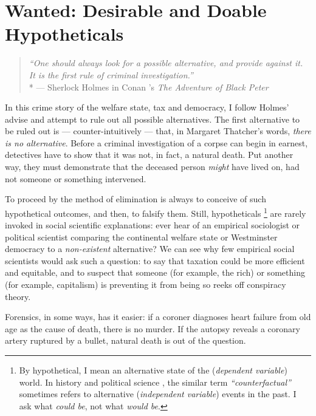 
\chapter[Wanted]{Wanted: Desirable and Doable Hypotheticals} \label{chap:wanted}

\begin{quote}
	\emph{``One should always look for a possible alternative, and provide against it. It is the first rule of criminal investigation.''}\\*
	--- Sherlock Holmes in Conan \citeauthor{Doyle1904}'s \emph{The Adventure of Black Peter} \citeyearpar[567]{Doyle1904}
\end{quote}

In this crime story of the welfare state, tax and democracy, I follow Holmes' advise and attempt to rule out all possible alternatives.
The first alternative to be ruled out is --- counter-intuitively --- that, in Margaret Thatcher's words, \emph{there is no alternative}.
Before a criminal investigation of a corpse can begin in earnest, detectives have to show that it was not, in fact, a natural death.
Put another way, they must demonstrate that the deceased person \emph{might} have lived on, had not someone or something intervened.

To proceed by the method of elimination is always to conceive of such hypothetical outcomes, and then, to falsify them. Still, hypotheticals
\footnote{
	By hypothetical, I mean an alternative state of the (\emph{dependent variable}) world.
	In history \citep[recently reviewed by][]{Bunzl2004} and political science \citep[for a methodological appraisal, see][]{Fearon1991}, the similar term \emph{``counterfactual''} sometimes refers to alternative (\emph{independent variable}) events in the past. I ask what \emph{could be}, not what \emph{would be}.
}
are rarely invoked in social scientific explanations: ever hear of an empirical sociologist or political scientist comparing the continental welfare state \citep{Esping-Andersen-1990-aa} or Westminster democracy \citep{Lijphart-1999-aa} to a \emph{non-existent} alternative?
We can see why few empirical social scientists would ask such a question: to say that taxation could be more efficient and equitable, and to suspect that someone (for example, the rich) or something (for example, capitalism) is preventing it from being so reeks off conspiracy theory.

Forensics, in some ways, has it easier: if a coroner diagnoses heart failure from old age as the cause of death, there is no murder.
If the autopsy reveals a coronary artery ruptured by a bullet, natural death is out of the question.

